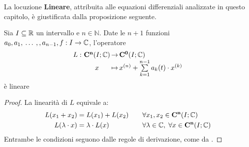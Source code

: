 La locuzione \textbf{Lineare}, attribuita alle equazioni differenziali analizzate in questo capitolo, è giustificata dalla proposizione seguente.
\begin{proposition}
	\label{prop:linearita_eq_diff}
	Sia $I\subseteq \mathbb{R}$ un intervallo e $n\in\mathbb{N}$. Date le $n+1$ funzioni $a_0,a_1,\:\dotsc\:,,a_{n-1},f:I\to\mathbb{C}$, l'operatore
	$$\funcdef{L}{x}[\cntclass{n}(I;\C)]{\cntclass{0}(I;\C)}[
		x^{(n)} + \sum\limits_{k=1}^{n-1}a_k(t) \cdot x^{(k)}
	]$$
	è lineare
	\begin{proof}
		La linearità di $L$ equivale a:
		\begin{alignat*}{2}
			L(x_1+x_2) &= L(x_1)+L(x_2) &\quad&\forall x_1,x_2\in \mathbf{C^{n}}(I;\mathbb{C})\\
			L(\lambda\cdot x) &= \lambda\cdot L(x) &&\forall \lambda\in\mathbb{C},\;\forall x\in \mathbf{C^{n}}(I;\mathbb{C})
		\end{alignat*}
		Entrambe le condizioni  seguono dalle regole di derivazione, come da .
	\end{proof}
\end{proposition}

